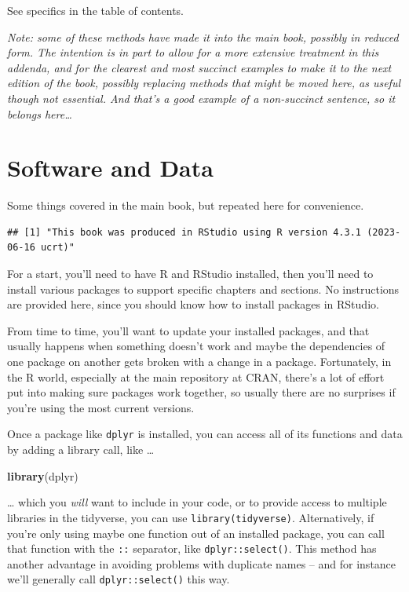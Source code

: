 \documentclass[
]{book}
\newenvironment{Shaded}{\begin{snugshade}}{\end{snugshade}}
\newcommand{\FunctionTok}[1]{\textcolor[rgb]{0.27,0.27,0.27}{\textbf{#1}}}
\newcommand{\NormalTok}[1]{#1}
\begin{document}
See specifics in the table of contents.

\emph{Note: some of these methods have made it into the main book, possibly in reduced form. The intention is in part to allow for a more extensive treatment in this addenda, and for the clearest and most succinct examples to make it to the next edition of the book, possibly replacing methods that might be moved here, as useful though not essential. And that's a good example of a non-succinct sentence, so it belongs here\ldots{}}

\hypertarget{software-and-data}{%
\section{Software and Data}\label{software-and-data}}

Some things covered in the main book, but repeated here for convenience.

\begin{verbatim}
## [1] "This book was produced in RStudio using R version 4.3.1 (2023-06-16 ucrt)"
\end{verbatim}

For a start, you'll need to have R and RStudio installed, then you'll need to install various packages to support specific chapters and sections. No instructions are provided here, since you should know how to install packages in RStudio.

From time to time, you'll want to update your installed packages, and that usually happens when something doesn't work and maybe the dependencies of one package on another gets broken with a change in a package. Fortunately, in the R world, especially at the main repository at CRAN, there's a lot of effort put into making sure packages work together, so usually there are no surprises if you're using the most current versions.

Once a package like \texttt{dplyr} is installed, you can access all of its functions and data by adding a library call, like \ldots{}

\begin{Shaded}
\begin{Highlighting}[]
\FunctionTok{library}\NormalTok{(dplyr)}
\end{Highlighting}
\end{Shaded}

\ldots{} which you \emph{will} want to include in your code, or to provide access to multiple libraries in the tidyverse, you can use \texttt{library(tidyverse)}. Alternatively, if you're only using maybe one function out of an installed package, you can call that function with the \texttt{::} separator, like \texttt{dplyr::select()}. This method has another advantage in avoiding problems with duplicate names -- and for instance we'll generally call \texttt{dplyr::select()} this way.
\end{document}
